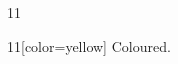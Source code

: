 \documentclass[paper=A4]{ropas-poster}
\begin{document}
\begin{postergrid}{1}{1}
\begin{posterblock}{1}{1}[color=yellow]
Coloured.
\end{posterblock}
\end{postergrid}
\end{document}
